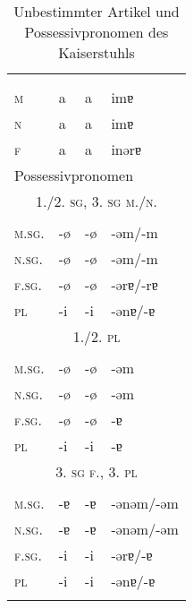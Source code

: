 \begin{table}[H]
	\caption{Unbestimmter Artikel und Possessivpronomen des Kaiserstuhls \citep[376, 380-384]{Noth1993}}\label{table117}
	\begin{tabular}{llll}
		\lsptoprule
		\multicolumn{4}{l}{unbestimmter Artikel}\\		
		& \NOM & \AKK & \DAT\\\midrule
		 \textsc{m} & a & a & imɐ\\
		 \textsc{n} & a & a & imɐ\\
		 \textsc{f} & a & a & inərɐ\\ \midrule
		\multicolumn{4}{l}{Possessivpronomen}\\	
		\multicolumn{4}{c}{\scshape 1./2. \textsc{sg}, 3. \textsc{sg} m./n.} \\\cmidrule(lr){1-4}	
		& \NOM & \AKK & \DAT\\\midrule
		\textsc{m.sg.} & {}-ø & {}-ø & {}-əm/-m\\
		\textsc{n.sg.} & {}-ø & {}-ø & {}-əm/-m\\
		\textsc{f.sg.} & {}-ø & {}-ø & {}-ərɐ/-rɐ\\
		\textsc{pl} & {}-i & {}-i & {}-ənɐ/-ɐ\\ \midrule
		\multicolumn{4}{c}{\scshape 1./2. \textsc{pl}} \\\cmidrule(lr){1-4}	
		& \NOM & \AKK & \DAT\\\midrule
		\textsc{m.sg.} & {}-ø & {}-ø & {}-əm\\
		\textsc{n.sg.} & {}-ø & {}-ø & {}-əm\\
		\textsc{f.sg.} & {}-ø & {}-ø & {}-ɐ\\
		\textsc{pl} & {}-i & {}-i & {}-ɐ\\ \midrule
		\multicolumn{4}{c}{\scshape 3. \textsc{sg} f., 3. pl} \\\cmidrule(lr){1-4}	
		& \NOM & \AKK & \DAT\\\midrule
		\textsc{m.sg.} & {}-ɐ & {}-ɐ & {}-ənəm/-əm\\
		\textsc{n.sg.} & {}-ɐ & {}-ɐ & {}-ənəm/-əm\\
		\textsc{f.sg.} & {}-i & {}-i & {}-ərɐ/-ɐ\\
		\textsc{pl} & {}-i & {}-i & {}-ənɐ/-ɐ\\
		\lspbottomrule
	\end{tabular}
\end{table}


